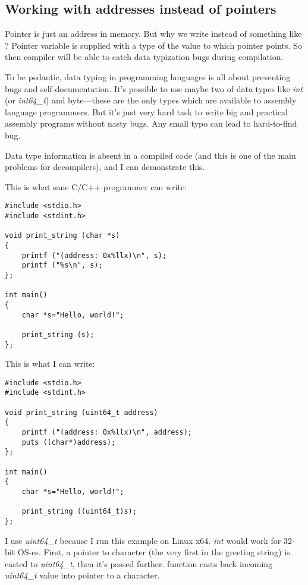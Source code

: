 \subsection{Working with addresses instead of pointers}

Pointer is just an address in memory. But why we write  instead of something like ?
Pointer variable is supplied with a type of the value to which pointer points.
So then compiler will be able to catch data typization bugs during compilation.

To be pedantic, data typing in programming languages is all about preventing bugs and self-documentation.
It's possible to use maybe two of data types like \emph{int} (or \emph{int64\_t}) and byte---these are the only types which are available to assembly language programmers.
But it's just very hard task to write big and practical assembly programs without nasty bugs.
Any small typo can lead to hard-to-find bug.

Data type information is absent in a compiled code (and this is one of the main problems for decompilers),
and I can demonstrate this.

This is what sane C/C++ programmer can write:

\begin{lstlisting}[style=customc]
#include <stdio.h>
#include <stdint.h>

void print_string (char *s)
{
	printf ("(address: 0x%llx)\n", s);
	printf ("%s\n", s);
};

int main()
{
	char *s="Hello, world!";

	print_string (s);
};
\end{lstlisting}

This is what I can write:

\begin{lstlisting}[style=customc]
#include <stdio.h>
#include <stdint.h>

void print_string (uint64_t address)
{
	printf ("(address: 0x%llx)\n", address);
	puts ((char*)address);
};

int main()
{
	char *s="Hello, world!";

	print_string ((uint64_t)s);
};
\end{lstlisting}

I use \emph{uint64\_t} because I run this example on Linux x64. \emph{int} would work for 32-bit \ac{OS}-es.
First, a pointer to character (the very first in the greeting string) is casted to \emph{uint64\_t}, then it's passed further.
 function casts back incoming \emph{uint64\_t} value into pointer to a character.

